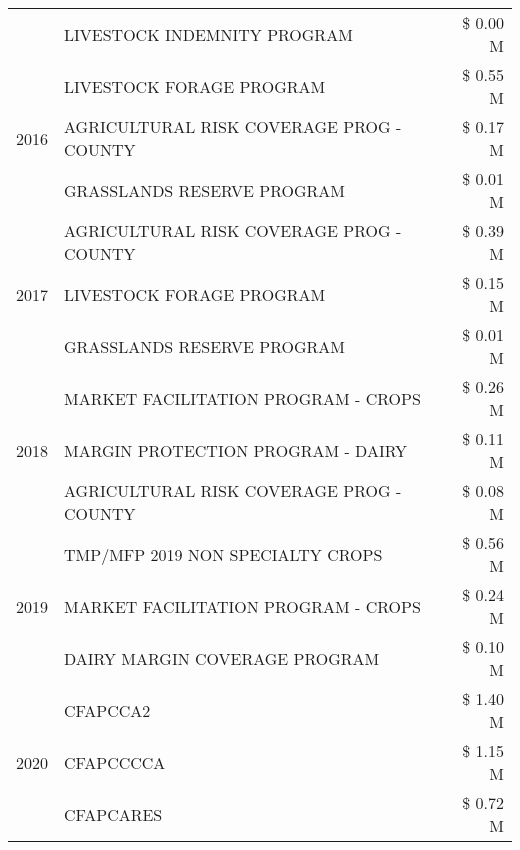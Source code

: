 \begin{tabular}{llr}
 & LIVESTOCK INDEMNITY PROGRAM & \$ 0.00 M \\
\cline{1-3}
\multirow[t]{3}{*}{2016} & LIVESTOCK FORAGE PROGRAM & \$ 0.55 M \\
 & AGRICULTURAL RISK COVERAGE PROG - COUNTY & \$ 0.17 M \\
 & GRASSLANDS RESERVE PROGRAM & \$ 0.01 M \\
\cline{1-3}
\multirow[t]{3}{*}{2017} & AGRICULTURAL RISK COVERAGE PROG - COUNTY & \$ 0.39 M \\
 & LIVESTOCK FORAGE PROGRAM & \$ 0.15 M \\
 & GRASSLANDS RESERVE PROGRAM & \$ 0.01 M \\
\cline{1-3}
\multirow[t]{3}{*}{2018} & MARKET FACILITATION PROGRAM - CROPS & \$ 0.26 M \\
 & MARGIN PROTECTION PROGRAM - DAIRY & \$ 0.11 M \\
 & AGRICULTURAL RISK COVERAGE PROG - COUNTY & \$ 0.08 M \\
\cline{1-3}
\multirow[t]{3}{*}{2019} & TMP/MFP 2019 NON SPECIALTY CROPS & \$ 0.56 M \\
 & MARKET FACILITATION PROGRAM - CROPS & \$ 0.24 M \\
 & DAIRY MARGIN COVERAGE PROGRAM & \$ 0.10 M \\
\cline{1-3}
\multirow[t]{3}{*}{2020} & CFAPCCA2 & \$ 1.40 M \\
 & CFAPCCCCA & \$ 1.15 M \\
 & CFAPCARES & \$ 0.72 M \\
\cline{1-3}
\bottomrule
\end{tabular}
